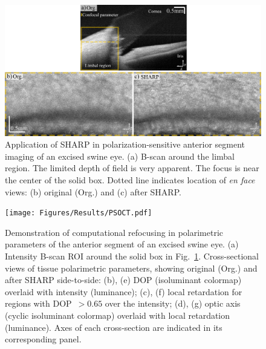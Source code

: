 \begin{figure}[htb!]
	\centering
	\includegraphics[width=\textwidth]{Figures/Results/PSOCT_Int.pdf}
	\caption[Application of SHARP in polarization-sensitive anterior segment imaging of an excised swine eye.]{Application of SHARP in polarization-sensitive anterior segment imaging of an excised swine eye. (a) B-scan around the limbal region. The limited depth of field is very apparent. The focus is near the center of the solid box. Dotted line indicates location of \textit{en face} views: (b) original (Org.) and (c) after SHARP.}
	\label{fig:PSOCT_int}
\end{figure}

\begin{figure}[b!]
	\centering
	\texttt{[image: Figures/Results/PSOCT.pdf]}
	\caption[Demonstration of computational refocusing in polarimetric parameters of the anterior segment of an excised swine eye.]{Demonstration of computational refocusing in polarimetric parameters of the anterior segment of an excised swine eye. (a) Intensity B-scan ROI around the solid box in Fig.~\ref{fig:PSOCT_int}. Cross-sectional views of tissue polarimetric parameters, showing original (Org.) and after SHARP side-to-side: (b), (e) DOP (isoluminant colormap) overlaid with intensity (luminance); (c), (f) local retardation for regions with DOP~$>0.65$ over the intensity; (d), (g) optic axis (cyclic isoluminant colormap) overlaid with local retardation (luminance). Axes of each cross-section are indicated in its corresponding panel.}
	\label{fig:PSOCT}
\end{figure}

